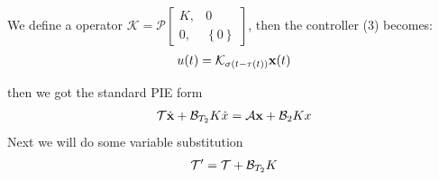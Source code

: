 \documentclass[twocolumn]{autart}    %
\begin{document}
\begin{pf}

    We define a operator $\mathcal{K} = \mathcal{P}\begin{bmatrix}
        K,&0\\
        0,&\left\{0\right\}
    \end{bmatrix}$, then the controller (3) becomes:
    \begin{equation} \label{e1}
        \begin{aligned}
            u(t) = \mathcal{K}_{\sigma(t-\tau(t))}\bold{x}(t)
        \end{aligned}
    \end{equation}
    
    then we got the standard PIE form 
    \begin{equation}
        \begin{aligned}
            \setlength{\arraycolsep}{0.9pt}
            \mathcal{T}\dot{\bold{x}}+\mathcal{B}_{T_{2}}K\dot{x} = \mathcal{A}\bold{x}+\mathcal{B}_{2}Kx
        \end{aligned}
    \end{equation}
    Next we will do some variable substitution
    \begin{equation}
        \begin{aligned}
            \setlength{\arraycolsep}{0.9pt}
            \mathcal{T}' = \mathcal{T}+\mathcal{B}_{T_{2}}K
        \end{aligned}
    \end{equation}
    

\end{pf}
\end{document}
